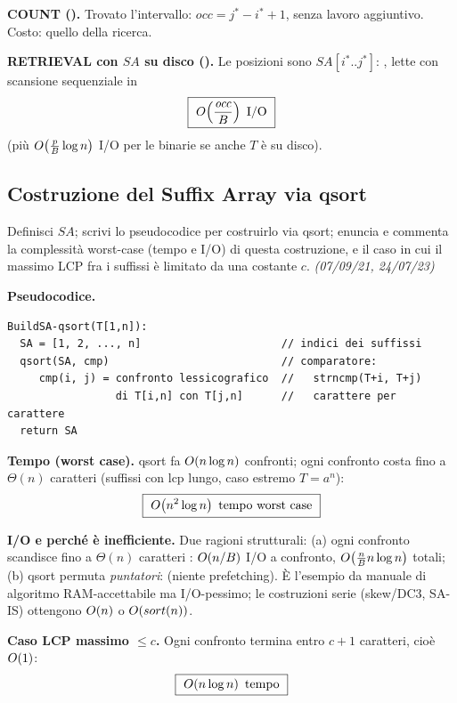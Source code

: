 \textbf{COUNT ().} Trovato l'intervallo:
$\boxed{\mathit{occ}=j^{*}-i^{*}+1}$, senza lavoro aggiuntivo. Costo: quello della ricerca.

\textbf{RETRIEVAL con $SA$ su disco ().} Le posizioni sono
$\mathit{SA}[i^{*}..j^{*}]$: , lette con scansione sequenziale in
\[
\boxed{\ \OO{\frac{\mathit{occ}}{B}}\ \text{I/O}\ }
\]
(pi\`u $O\!\left(\frac{p}{B}\log n\right)$ I/O per le binarie se anche $T$ \`e su disco). 

\subsection*{ Costruzione del Suffix Array via qsort}

\begin{domanda}
Definisci $SA$; scrivi lo pseudocodice per costruirlo via qsort; enuncia e commenta la
complessit\`a worst-case (tempo e I/O) di questa costruzione, e il caso in cui il massimo LCP fra
i suffissi \`e limitato da una costante $c$. \emph{(07/09/21, 24/07/23)}
\end{domanda}

\textbf{Pseudocodice.}
\begin{verbatim}
BuildSA-qsort(T[1,n]):
  SA = [1, 2, ..., n]                      // indici dei suffissi
  qsort(SA, cmp)                           // comparatore:
     cmp(i, j) = confronto lessicografico  //   strncmp(T+i, T+j)
                 di T[i,n] con T[j,n]      //   carattere per carattere
  return SA
\end{verbatim}

\textbf{Tempo (worst case).} qsort fa $O\!\left(n\log n\right)$ confronti; ogni confronto costa fino a
$\Theta(n)$ caratteri (suffissi con lcp lungo, caso estremo $T=a^n$):
\[
\boxed{\ O\!\left(n^2\log n\right)\ \text{tempo worst case}\ }
\]

\textbf{I/O e perch\'e \`e inefficiente.} Due ragioni strutturali:
(a) ogni confronto scandisce fino a $\Theta(n)$ caratteri : $O\!\left(n/B\right)$ I/O a confronto, $O\!\left(\frac{n}{B}n\log n\right)$ totali;
(b) qsort permuta \emph{puntatori}:  (niente prefetching). \`E l'esempio da manuale di algoritmo RAM-accettabile ma
I/O-pessimo; le costruzioni serie (skew/DC3, SA-IS) ottengono $O\!\left(n\right)$ o $O\!\left(sort(n)\right)$.

\textbf{Caso LCP massimo $\le c$.} Ogni confronto termina entro $c+1$ caratteri, cio\`e $O\!\left(1\right)$:
\[
\boxed{\ \OO{n\log n}\ \text{tempo}\ }
\]

